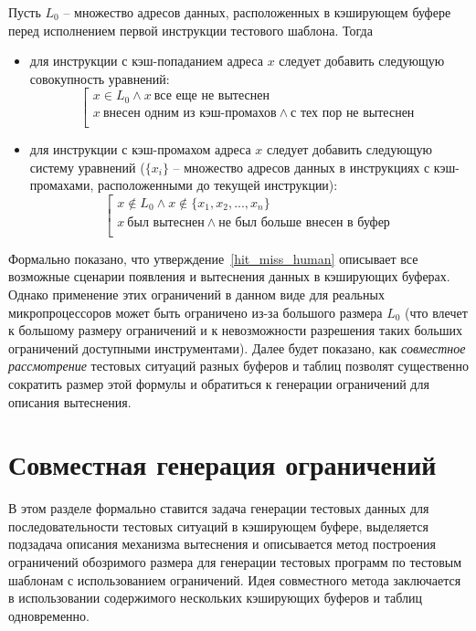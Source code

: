 \begin{utv}\label{hit_miss_human} Пусть $L_0$ -- множество
адресов данных, расположенных в кэширующем буфере перед исполнением
первой инструкции тестового шаблона. Тогда
\begin{itemize}
\item для инструкции с кэш-попаданием адреса $x$ следует добавить
следующую совокупность уравнений:
$$
\left[
   \begin{array}{l}
    x \in L_0 \wedge x~\mbox{все еще не вытеснен} \\
    x~\mbox{внесен одним из кэш-промахов} \wedge \mbox{с тех пор не вытеснен} \\
   \end{array}
  \right.
$$

\item для инструкции с кэш-промахом адреса $x$ следует добавить следующую систему
уравнений ($\{x_i\}$ -- множество адресов данных в инструкциях с
кэш-промахами, расположенными до текущей инструкции):
$$
\left[
   \begin{array}{l}
    x \notin L_0 \wedge x \notin \{x_1, x_2, ..., x_n\} \\
    x~\mbox{был вытеснен} \wedge \mbox{не был больше внесен в буфер}\\
  \end{array}
\right.
$$

\end{itemize}
\end{utv}

Формально показано, что утверждение~\ref{hit_miss_human} описывает
все возможные сценарии появления и вытеснения данных в кэширующих
буферах. Однако применение этих ограничений в данном виде для
реальных микропроцессоров может быть ограничено из-за большого
размера $L_0$ (что влечет к большому размеру ограничений и к
невозможности разрешения таких больших ограничений доступными
инструментами). Далее будет показано, как \emph{совместное
рассмотрение} тестовых ситуаций разных буферов и таблиц позволят
существенно сократить размер этой формулы и обратиться к генерации
ограничений для описания вытеснения.

\section{Совместная генерация ограничений}

В этом разделе формально ставится задача генерации тестовых данных
для последовательности тестовых ситуаций в кэширующем буфере,
выделяется подзадача описания механизма вытеснения и описывается
метод построения ограничений обозримого размера для генерации
тестовых программ по тестовым шаблонам с использованием ограничений.
Идея совместного метода заключается в использовании содержимого
нескольких кэширующих буферов и таблиц одновременно.



